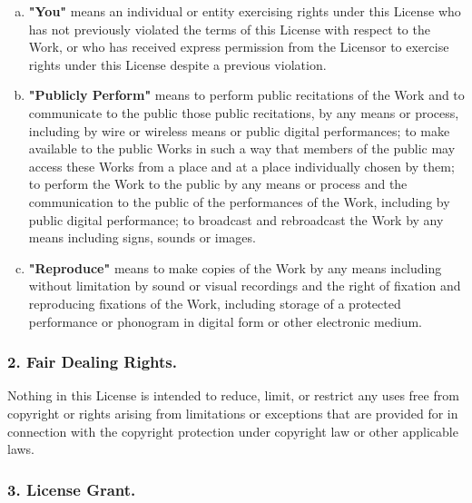 \begin{enumerate}[a.]
          \item\textbf{"You"} means an individual or entity
          exercising rights under this License who has not
          previously violated the terms of this License with
          respect to the Work, or who has received express
          permission from the Licensor to exercise rights under
          this License despite a previous violation.

          \item\textbf{"Publicly Perform"} means to perform
          public recitations of the Work and to communicate to the
          public those public recitations, by any means or process,
          including by wire or wireless means or public digital
          performances; to make available to the public Works in
          such a way that members of the public may access these
          Works from a place and at a place individually chosen by
          them; to perform the Work to the public by any means or
          process and the communication to the public of the
          performances of the Work, including by public digital
          performance; to broadcast and rebroadcast the Work by any
          means including signs, sounds or images.

          \item\textbf{"Reproduce"} means to make copies of
          the Work by any means including without limitation by
          sound or visual recordings and the right of fixation and
          reproducing fixations of the Work, including storage of a
          protected performance or phonogram in digital form or
          other electronic medium.
\end{enumerate}


        \subsubsection{2. Fair Dealing Rights.}

Nothing in this
        License is intended to reduce, limit, or restrict any uses
        free from copyright or rights arising from limitations or
        exceptions that are provided for in connection with the
        copyright protection under copyright law or other
        applicable laws.

        \subsubsection{3. License Grant.}

